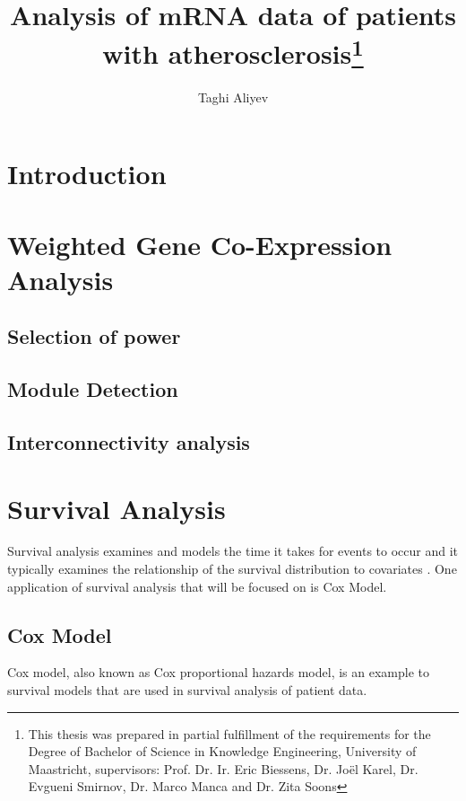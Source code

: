 \documentclass{ba-kecs}
\numberwithin{figure}{section}
\numberwithin{equation}{section}
\begin{document}
\title{Analysis of mRNA data of patients with atherosclerosis\footnote{This thesis was prepared in partial fulfillment of the requirements
 for the Degree of Bachelor of Science in Knowledge Engineering,
University of Maastricht,  supervisors: Prof. Dr. Ir. Eric Biessens, Dr. Jo\"{e}l Karel, Dr. Evgueni Smirnov, Dr. Marco Manca and Dr. Zita Soons}}
\author{Taghi Aliyev \\}
\maketitle



\begin{abstract}


\end{abstract}


\section{Introduction}

\section{Weighted Gene Co-Expression Analysis}
\subsection{Selection of power}
\subsection{Module Detection}
\subsection{Interconnectivity analysis}

\section{Survival Analysis}
Survival analysis examines and models the time it takes for events to occur and it typically examines the relationship of the survival distribution to covariates \cite{cox}. One application of survival analysis that will be focused on is Cox Model.
\subsection{Cox Model}
Cox model, also known as Cox proportional hazards model, is an example to survival models that are used in survival analysis of patient data. 
\end{document}
